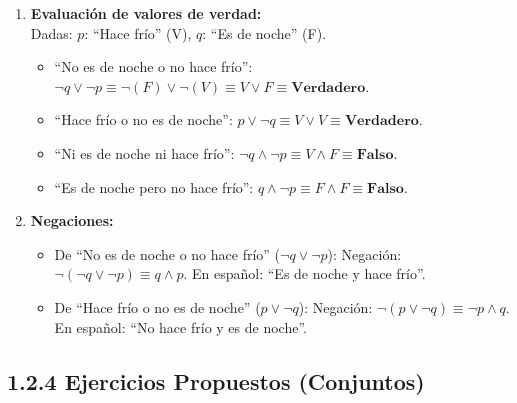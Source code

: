 \documentclass[letterpaper, 12pt]{article}
\begin{document}
\begin{enumerate}
    \item \textbf{Evaluación de valores de verdad:} \\
    Dadas: $p$: ``Hace frío'' (V), $q$: ``Es de noche'' (F).
    
    \begin{itemize}
        \item ``No es de noche o no hace frío'': $\neg q \lor \neg p \equiv \neg(F) \lor \neg(V) \equiv V \lor F \equiv \textbf{Verdadero}$.
        \item ``Hace frío o no es de noche'': $p \lor \neg q \equiv V \lor V \equiv \textbf{Verdadero}$.
        \item ``Ni es de noche ni hace frío'': $\neg q \land \neg p \equiv V \land F \equiv \textbf{Falso}$.
        \item ``Es de noche pero no hace frío'': $q \land \neg p \equiv F \land F \equiv \textbf{Falso}$.
    \end{itemize}

    \item \textbf{Negaciones:}
    \begin{itemize}
        \item De ``No es de noche o no hace frío'' ($\neg q \lor \neg p$):
        Negación: $\neg(\neg q \lor \neg p) \equiv q \land p$.
        En español: ``Es de noche y hace frío''.
        \item De ``Hace frío o no es de noche'' ($p \lor \neg q$):
        Negación: $\neg(p \lor \neg q) \equiv \neg p \land q$.
        En español: ``No hace frío y es de noche''.
    \end{itemize}
\end{enumerate}

\subsection{1.2.4 Ejercicios Propuestos (Conjuntos)}
\end{document}
